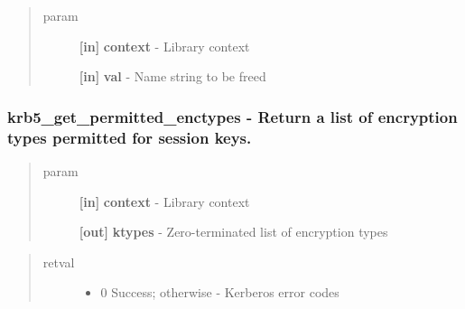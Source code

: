 \documentclass[letterpaper,10pt,english]{sphinxmanual}
\begin{document}
\begin{quote}\begin{description}
\item[{param}] \leavevmode
\textbf{{[}in{]}} \textbf{context} - Library context

\textbf{{[}in{]}} \textbf{val} - Name string to be freed

\end{description}\end{quote}


\subsubsection{krb5\_get\_permitted\_enctypes -  Return a list of encryption types permitted for session keys.}
\label{appdev/refs/api/krb5_get_permitted_enctypes:krb5-get-permitted-enctypes-return-a-list-of-encryption-types-permitted-for-session-keys}\label{appdev/refs/api/krb5_get_permitted_enctypes::doc}

\begin{fulllineitems}
\label{appdev/refs/api/krb5_get_permitted_enctypes:c.krb5_get_permitted_enctypes}
\end{fulllineitems}

\begin{quote}\begin{description}
\item[{param}] \leavevmode
\textbf{{[}in{]}} \textbf{context} - Library context

\textbf{{[}out{]}} \textbf{ktypes} - Zero-terminated list of encryption types

\end{description}\end{quote}
\begin{quote}\begin{description}
\item[{retval}] \leavevmode\begin{itemize}
\item {} 
0   Success; otherwise - Kerberos error codes

\end{itemize}

\end{description}\end{quote}
\end{document}
